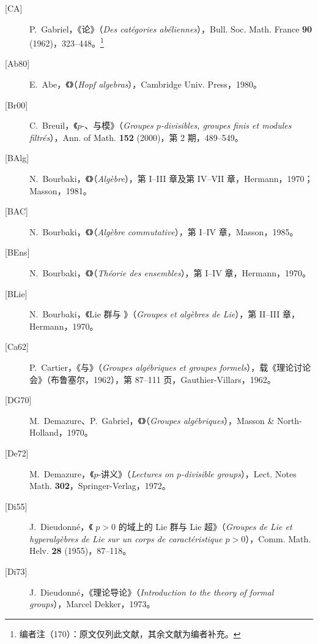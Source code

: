 \begin{description}
\item[{[CA]}] P.~Gabriel，《论》（\textit{Des catégories abéliennes}），Bull. Soc. Math. France \textbf{90} (1962)，323--448。\footnote{编者注（170）：原文仅列此文献，其余文献为编者补充。}
\item[{[Ab80]}] E.~Abe，《》（\textit{Hopf algebras}），Cambridge Univ. Press，1980。
\item[{[Br00]}] C.~Breuil，《$p$-、与模》（\textit{Groupes $p$-divisibles, groupes finis et modules filtrés}），Ann. of Math. \textbf{152} (2000)，第 2 期，489--549。
\item[{[BAlg]}] N.~Bourbaki，《》（\textit{Algèbre}），第 I--III 章及第 IV--VII 章，Hermann，1970；Masson，1981。
\item[{[BAC]}] N.~Bourbaki，《》（\textit{Algèbre commutative}），第 I--IV 章，Masson，1985。
\item[{[BEns]}] N.~Bourbaki，《》（\textit{Théorie des ensembles}），第 I--IV 章，Hermann，1970。
\item[{[BLie]}] N.~Bourbaki，《Lie 群与 》（\textit{Groupes et algèbres de Lie}），第 II--III 章，Hermann，1970。
\item[{[Ca62]}] P.~Cartier，《与》（\textit{Groupes algébriques et groupes formels}），载《理论讨论会》（布鲁塞尔，1962），第 87--111 页，Gauthier-Villars，1962。
\item[{[DG70]}] M.~Demazure、P.~Gabriel，《》（\textit{Groupes algébriques}），Masson \& North-Holland，1970。
\item[{[De72]}] M.~Demazure，《$p$-讲义》（\textit{Lectures on $p$-divisible groups}），Lect. Notes Math. \textbf{302}，Springer-Verlag，1972。
\item[{[Di55]}] J.~Dieudonn\'e，《 $p>0$ 的域上的 Lie 群与 Lie 超》（\textit{Groupes de Lie et hyperalgèbres de Lie sur un corps de caractéristique $p>0$}），Comm. Math. Helv. \textbf{28} (1955)，87--118。
\item[{[Di73]}] J.~Dieudonn\'e，《理论导论》（\textit{Introduction to the theory of formal groups}），Marcel Dekker，1973。

\end{description}
